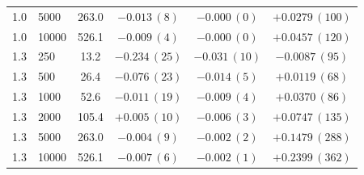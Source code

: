 \begin{tabular}{llcccc}
1.0 & 5000 & 263.0 & $-0.013\,(8)$ & $-0.000\,(0)$ & $+0.0279\,(100)$\\
1.0 & 10000 & 526.1 & $-0.009\,(4)$ & $-0.000\,(0)$ & $+0.0457\,(120)$\\
1.3 & 250 & 13.2 & $-0.234\,(25)$ & $-0.031\,(10)$ & $-0.0087\,(95)$\\
1.3 & 500 & 26.4 & $-0.076\,(23)$ & $-0.014\,(5)$ & $+0.0119\,(68)$\\
1.3 & 1000 & 52.6 & $-0.011\,(19)$ & $-0.009\,(4)$ & $+0.0370\,(86)$\\
1.3 & 2000 & 105.4 & $+0.005\,(10)$ & $-0.006\,(3)$ & $+0.0747\,(135)$\\
1.3 & 5000 & 263.0 & $-0.004\,(9)$ & $-0.002\,(2)$ & $+0.1479\,(288)$\\
1.3 & 10000 & 526.1 & $-0.007\,(6)$ & $-0.002\,(1)$ & $+0.2399\,(362)$\\
\hline\hline
\end{tabular}

